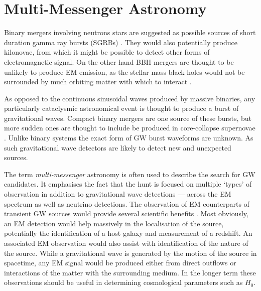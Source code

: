 \section{Multi-Messenger Astronomy}
\label{sec:multi}
\begin{colsection}


\begin{colsection}




Binary mergers involving neutrons stars are suggested as possible sources of short duration gamma ray bursts (SGRBs) \citep{GW-NSbinaries}. They would also potentially produce kilonovae, from which it might be possible to detect other forms of electromagnetic signal. On the other hand BBH mergers are thought to be unlikely to produce EM emission, as the stellar-mass black holes would not be surrounded by much orbiting matter with which to interact \citep{GW-BHbinaries,GW150914followup}.

As opposed to the continuous sinusoidal waves produced by massive binaries, any particularly cataclysmic astronomical event is thought to produce a burst of gravitational waves. Compact binary mergers are one source of these bursts, but more sudden ones are thought to include be produced in core-collapse supernovae \citep{GW-supernovae}. Unlike binary systems the exact form of GW burst waveforms are unknown. As such gravitational wave detectors are likely to detect new and unexpected sources.

The term \emph{multi-messenger} astronomy is often used to describe the search for GW candidates. It emphasises the fact that the hunt is focused on multiple `types' of observation in addition to gravitational wave detections --- across the EM spectrum as well as neutrino detections. The observation of EM counterparts of transient GW sources would provide several scientific benefits \citep{LIGO-EM, LIGO-firstrun-2012}. Most obviously, an EM detection would help massively in the localisation of the source, potentially the identification of a host galaxy and measurement of a redshift. An associated EM observation would also assist with identification of the nature of the source. While a gravitational wave is generated by the motion of the source in spacetime, any EM signal would be produced either from direct outflows or interactions of the matter with the surrounding medium. In the longer term these observations should be useful in determining cosmological parameters such as $H_0$.


\end{colsection}
\end{colsection}
